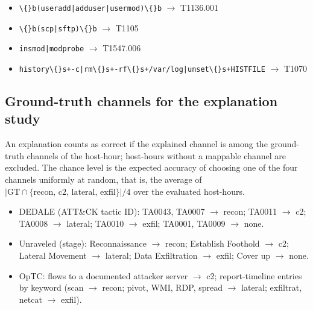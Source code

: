 \begin{itemize}
\item \texttt{\textbackslash\{\}b(\allowbreak{}useradd|\allowbreak{}adduser|\allowbreak{}usermod)\allowbreak{}\textbackslash\{\}b} $\rightarrow$ T1136.\allowbreak{}001
\item \texttt{\textbackslash\{\}b(\allowbreak{}scp|\allowbreak{}sftp)\allowbreak{}\textbackslash\{\}b} $\rightarrow$ T1105
\item \texttt{insmod|\allowbreak{}modprobe} $\rightarrow$ T1547.\allowbreak{}006
\item \texttt{history\textbackslash\{\}s+\allowbreak{}-\allowbreak{}c|\allowbreak{}rm\textbackslash\{\}s+\allowbreak{}-\allowbreak{}rf\textbackslash\{\}s+\allowbreak{}/\allowbreak{}var/\allowbreak{}log|\allowbreak{}unset\textbackslash\{\}s+\allowbreak{}HISTFILE} $\rightarrow$ T1070
\end{itemize}

\subsection{Ground-truth channels for the explanation study}
An explanation counts as correct if the explained channel is among the ground-truth channels of the host-hour;
host-hours without a mappable channel are excluded. The chance level is the expected accuracy of choosing one of the
four channels uniformly at random, that is, the average of $|\mathrm{GT}\cap\{\text{recon, c2, lateral, exfil}\}|/4$
over the evaluated host-hours.
\begin{itemize}\footnotesize
\item DEDALE (ATT\&CK tactic ID): TA0043, TA0007 $\rightarrow$ recon; TA0011 $\rightarrow$ c2; TA0008 $\rightarrow$
lateral; TA0010 $\rightarrow$ exfil; TA0001, TA0009 $\rightarrow$ none.
\item Unraveled (stage): Reconnaissance $\rightarrow$ recon; Establish Foothold $\rightarrow$ c2; Lateral Movement
$\rightarrow$ lateral; Data Exfiltration $\rightarrow$ exfil; Cover up $\rightarrow$ none.
\item OpTC: flows to a documented attacker server $\rightarrow$ c2; report-timeline entries by keyword (scan
$\rightarrow$ recon; pivot, WMI, RDP, spread $\rightarrow$ lateral; exfiltrat, netcat $\rightarrow$ exfil).
\end{itemize}

